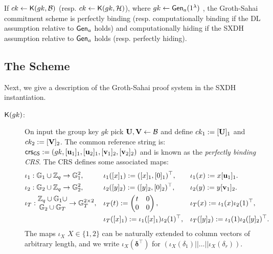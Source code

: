 \begin{theorem} If $ck\gets\mathsf{K}(gk,\mathcal{B})$ (resp. $ck\gets\mathsf{K}(gk,\mathcal{H})$), where $gk\gets\mathsf{Gen}_a(1^\lambda)$ , the Groth-Sahai commitment scheme is perfectly binding (resp. computationally binding if the DL assumption relative to $\mathsf{Gen}_a$ holds) and computationally hiding if the SXDH assumption relative to $\mathsf{Gen}_a$ holds (resp. perfectly hiding).

\end{theorem}

\subsection{The Scheme} \label{sec:gs-proofs-scheme}
Next, we give a description of the Groth-Sahai proof system in the SXDH instantiation.
\begin{description}
\item[$\mathsf{K}(gk)$:]  On input the group key $gk$ pick $\mathbf{{U}},\mathbf{{V}}\gets\mathcal{B}$ and define $ck_1 := [\mathbf{{U}}]_1$ and $ck_2:=[\mathbf{{V}}]_2$.
   The common reference string is:
   $\mathsf{crs}_{\mathsf{GS}}:=(gk,[\mathbf{u}_1]_1,[\mathbf{u}_2]_1,[\mathbf{v}_1]_2,[\mathbf{v}_2]_2)$ and is known as the \emph{perfectly binding CRS}.
The CRS defines some associated maps:
\begin{align*}
&\iota_1: \mathbb{G}_1 \cup \mathbb{Z}_q \rightarrow \mathbb{G}_1^2,& &\iota_1([x]_1):=([x]_1,[0]_1)^\top,& &\iota_1(x):=x[\mathbf{u}_1]_1. \\
&\iota_2: \mathbb{G}_2 \cup \mathbb{Z}_q \rightarrow \mathbb{G}_2^2,& &\iota_2([y]_2):=([y]_2,[0]_2)^\top,& &\iota_2(y):=y[\mathbf{v}_1]_2.\\
&\iota_T: \begin{matrix}\mathbb{Z}_q\cup\mathbb{G}_1\cup\\\mathbb{G}_2\cup\mathbb{G}_T\end{matrix} \rightarrow \mathbb{G}_T^{2\times2}, &
    &\iota_T(t):=\left(\begin{matrix}t & 0 \\ 0 & 0\end{matrix}\right),& & \iota_T(x) := \iota_1(x)\iota_2(1)^\top,\\
&                                       & &\iota_T([x]_1):=\iota_1([x]_1)\iota_2(1)^\top,& &\iota_T([y]_2) := \iota_1(1)\iota_2([y]_2)^\top.
\end{align*}
The maps $\iota_X$ $X \in \{1,2\}$ can be naturally extended to column vectors of arbitrary length, and we write $\iota_X(\boldsymbol \delta^{\top})$ for 
$(\iota_X(\delta_1)|| \ldots ||\iota_X(\delta_r))$.


\end{description}

